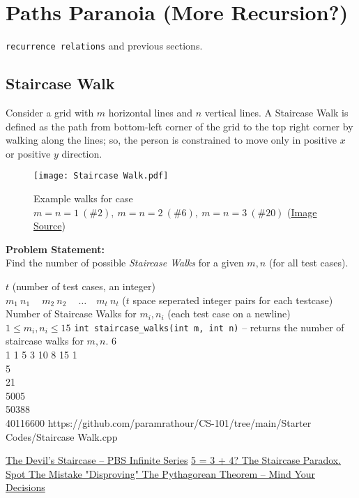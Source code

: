 \section{Paths Paranoia (More Recursion?)}{\label{sec:paths}}
\begin{topics}
\verb!recurrence relations! and previous sections.
\end{topics}	
\subsection{Staircase Walk}{\label{pp:staircasewalk}}
Consider a grid with $m$ horizontal lines and $n$ vertical lines. A Staircase Walk is defined as the path from bottom-left corner of the grid to the top right corner by walking along the lines; so, the person is constrained to move only in positive $x$ or positive $y$ direction.
\begin{figure}[H]
	\centering
	\texttt{[image: Staircase Walk.pdf]}
	\caption{Example walks for case $m=n=1\ (\#2),\ m=n=2\ (\#6),\ m=n=3\ (\#20)$ (\href{https://mathworld.wolfram.com/StaircaseWalk.html}{Image Source})}
	\label{fig:staircasewalk}
\end{figure}
\vspace{-1em}
\textbf{Problem Statement:}\\
Find the number of possible \emph{Staircase Walks} for a given $m,n$ (for all test cases).
\begin{testcasesFunction}
	{$t$ \hfill(number of test cases, an integer)\\
	$m_1\ n_1\ \quad m_2\ n_2\ \quad \ldots\quad m_t\ n_t$ \hfill($t$ space seperated integer pairs for each testcase)}
	{Number of Staircase Walks for $m_i, n_i$  \hfill(each test case on a newline)}
	{$1 \leq m_i, n_i \leq 15$}
	{\texttt{int staircase\_walks(int m, int n)} -- returns the number of staircase walks for $m,n$.}
	{6\\1 1 5 3 10 8 15}
	{1\\5\\21\\5005\\50388\\40116600}
	{https://github.com/paramrathour/CS-101/tree/main/Starter Codes/Staircase Walk.cpp}
\end{testcasesFunction}
\begin{funvideo}
\href{https://youtu.be/dQXVn7pFsVI}{The Devil's Staircase -- PBS Infinite Series}
\href{https://youtu.be/LWPOlZBXtD8}{5 = 3 + 4? The Staircase Paradox. Spot The Mistake "Disproving" The Pythagorean Theorem -- Mind Your Decisions}
\end{funvideo}
